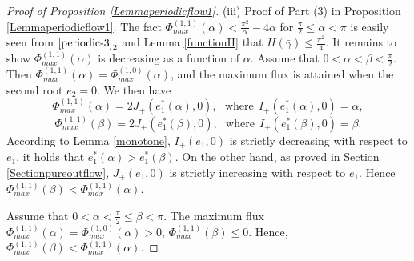 \documentclass[reqno,12pt]{amsart}
\newtheorem{remark}{Remark}[section]
\begin{document}
\begin{proof}[Proof of Proposition \ref{Lemmaperiodicflow1}]
  (iii) Proof of Part (3) in Proposition \ref{Lemmaperiodicflow1}.
  The fact $\Phi^{(1,1)}_{max}(\alpha)<\frac{\pi^2}{\alpha}-4\alpha$ for $\frac{\pi}{2}\leq\alpha<\pi$ is easily seen from ${\eqref{periodic-3}}_2$ and Lemma \ref{functionH} that $H(\bar{\gamma})\leq \frac{\pi^2}{4}$.
It remains to show  $\Phi_{max}^{(1, 1)}(\alpha)$ is decreasing as a function of $\alpha$.
Assume that $0< \alpha < \beta < \frac{\pi}{2} $. Then $\Phi_{max}^{(1, 1)}(\alpha) = \Phi_{max}^{(1, 0)}(\alpha)$, and the maximum flux is attained when the second root $e_2=0$. We then have
\begin{equation*}
    \Phi_{max}^{(1, 1)}(\alpha) = 2 J_{+}(e_1^*(\alpha), 0), \ \ \ \mbox{where}\ \  I_{+}(e_1^*(\alpha), 0) =\alpha, 
\end{equation*}
\begin{equation*}
    \Phi_{max}^{(1, 1)}(\beta) = 2 J_{+}(e_1^*(\beta), 0), \ \ \ 
    \mbox{where}\ \ I_{+}(e_1^*(\beta), 0) =\beta.
\end{equation*}
According to Lemma \ref{monotone}, $I_{+}(e_1, 0)$ is strictly decreasing with respect to $e_1$, it holds that $e_1^*(\alpha)> e_1^*(\beta).$ On the other hand, as proved in Section \ref{Sectionpureoutflow}, $J_{+}(e_1, 0)$ is strictly increasing with respect to $e_1$. 
Hence $\Phi_{max}^{(1, 1)}(\beta)< \Phi_{max}^{(1,1)}(\alpha). $

Assume that $0< \alpha < \frac{\pi}{2}\leq \beta < \pi$. 
The maximum flux $\Phi_{max}^{(1, 1)} (\alpha) =\Phi_{max}^{(1, 0)} (\alpha)> 0$,  $\Phi_{max}^{(1, 1)}(\beta) \leq 0$. Hence, $\Phi_{max}^{(1,1)}(\beta)< \Phi_{max}^{(1, 1)}(\alpha). $





\end{proof}
\end{document}
